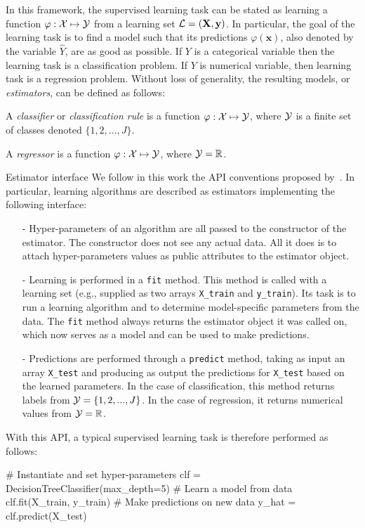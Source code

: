 In this framework, the supervised learning task can be stated as learning a
function $\varphi: {\cal X} \mapsto {\cal Y}$ from a learning set ${\cal
L}=(\mathbf{X}, \mathbf{y})$. In particular, the goal of the learning task is
to find a model such that its predictions $\varphi(\mathbf{x})$, also denoted
by the variable $\hat{Y}$, are as good as possible. If $Y$ is a categorical
variable then the learning task is a classification problem. If $Y$ is
numerical variable, then learning task is a regression problem. Without loss of
generality, the resulting models, or \textit{estimators}, can be defined as
follows:

\begin{definition}
A \emph{classifier} or \emph{classification rule} is a function $\varphi: {\cal X}
\mapsto {\cal Y}$, where ${\cal Y}$ is a finite set of classes denoted $\{1, 2, ..., J\}$.
\end{definition}

\begin{definition}
A \emph{regressor} is a function $\varphi: {\cal X} \mapsto {\cal Y}$, where ${\cal Y}=\mathbb{R}$.
\end{definition}

\begin{remark}{Estimator interface}
We follow in this work the API conventions proposed by~\citet{buitinck:2013}.
In particular, learning algorithms are described as estimators implementing the
following interface:

\begin{itemize}
\item[-] Hyper-parameters of an algorithm are all passed to the constructor of the
estimator. The constructor does not see any actual data. All it does
is to attach hyper-parameters values as public attributes to the estimator object.
\item[-] Learning is performed in a \texttt{fit} method. This method is called with
a learning set (e.g., supplied as two arrays \texttt{X\_train} and \texttt{y\_train}). Its
task is to run a learning algorithm and to determine model-specific parameters
from the data. The \texttt{fit} method always returns the estimator object
it was called on, which now serves as a model and can be used to make predictions.
\item[-] Predictions are performed through a \texttt{predict} method, taking
as input an array \texttt{X\_test} and producing as output the predictions for
\texttt{X\_test} based on the learned parameters. In the case of classification,
this method returns labels from ${\cal Y} = \{1, 2, ..., J\}$. In the case of regression,
it returns numerical values from ${\cal Y} = \mathbb{R}$.
\end{itemize}

With this API, a typical supervised learning task is therefore performed as follows:

\vskip0.3cm
\begin{pythoncode}
# Instantiate and set hyper-parameters
clf = DecisionTreeClassifier(max_depth=5)
# Learn a model from data
clf.fit(X_train, y_train)
# Make predictions on new data
y_hat = clf.predict(X_test)
\end{pythoncode}
\end{remark}


